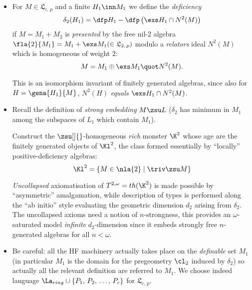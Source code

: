 \documentclass[a4paper,11pt,german,english]{report}
\newcommand{\nl}[1]{\mathfrak{L}_{#1,\,p}}
\begin{document}
\begin{itemize}
\item[]%
For $M\in\mathfrak{L}_{c,\,p}$ and a finite $H_{1}\inn M_{1}$ we define the {\em deficiency}
$$\delta_{2}(H_{1})=\dfp H_{1}-\dfp\left(
\exs H_{1}\cap N^{2}(M)\right)$$
if $M=M_{1}+M_{2}$ is {\em presented} by the free nil-$2$
algebra $\fla{2}{M_{1}}=M_{1}+\exs M_{1}(\in\mathfrak{L}_{2,\,p})$ modulo a {\em relators} ideal $N^{2}(M)$
which is homogeneous of weight $2$:
$$M=M_{1}\oplus\exs M_{1}\quot N^{2}(M).$$


This is an isomorphism invariant of finitely generated algebras, since also
for $H=\gena{H_{1}}{M}$, $N^{2}(H)$ {\em equals} $\exs H_{1}\cap N^{2}(M)$.

\item[]Recall the definition of {\em strong embedding} $M\zsu L$ ($\delta_{2}$ has minimum
in $M_{1}$ among the subspaces of $L_{1}$ which contain $M_{1}$).

Construct the $\zsu[]{}$-homogeneous {\em rich} monster $\K^{2}$ whose age are the finitely generated objects of $\Kl^{2}$, the class formed essentially by ``locally'' positive-deficiency algebras:
$$\Kl^{2}=\{M\in\nla{2}\mid \triv\zsu M\}$$

{\em Uncollapsed} axiomatisation of $T^{2,\omega}=th(\K^{2})$ is made possible by ``asymmetric'' amalgamation, while
description of types is performed along the ``ab initio'' style evaluating the geometric
dimension $d_{2}$ arising from $\delta_{2}$. The uncollapsed axioms need a notion
of $n$-strongness, this provides an $\omega$-saturated model {\em infinite}
$d_{2}$-dimension since it embeds strongly free $n$-generated algebras for
all $n<\omega$.

\item[]Be careful: all the HF machinery actually takes place on the {\em definable} set $M_{1}$
(in particular $M_{1}$ is the domain for the pregeometry $\cl_{2}$ induced by $\delta_{2}$)
so actually all the relevant definition are referred to $M_{1}$. We choose indeed language
$\La_{ring}%
\cup\{P_{1},\,P_{2},\,\dots,\,P_{c}\}$ for $\nl{c}$.
\end{itemize}
\end{document}
